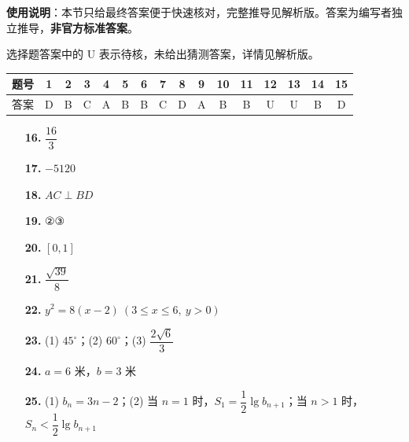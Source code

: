 
\begin{gknotice}
\textbf{使用说明}：本节只给最终答案便于快速核对，完整推导见解析版。答案为编写者独立推导，\textbf{非官方标准答案}。
\end{gknotice}

\begin{gknotice}
选择题答案中的 U 表示待核，未给出猜测答案，详情见解析版。
\end{gknotice}

\begin{center}\begin{tabular}{cccccccccccccccc}
\toprule
题号 & 1 & 2 & 3 & 4 & 5 & 6 & 7 & 8 & 9 & 10 & 11 & 12 & 13 & 14 & 15 \\
\midrule
答案 & D & B & C & A & B & B & C & D & A & B & B & U & U & B & D \\
\bottomrule
\end{tabular}\end{center}

\begin{itemize}[leftmargin=2.6em]
  \item[\textbf{16.}] $\dfrac{16}{3}$
  \item[\textbf{17.}] $-5120$
  \item[\textbf{18.}] $AC\perp BD$
  \item[\textbf{19.}] ②③
\end{itemize}

\begin{itemize}[leftmargin=2.6em]
  \item[\textbf{20.}] $[0,1]$
  \item[\textbf{21.}] $\dfrac{\sqrt{39}}8$
  \item[\textbf{22.}] $y^2=8(x-2)\ (3\le x\le 6,\ y>0)$
  \item[\textbf{23.}] (1) $45^\circ$；(2) $60^\circ$；(3) $\dfrac{2\sqrt6}3$
  \item[\textbf{24.}] $a=6$ 米，$b=3$ 米
  \item[\textbf{25.}] (1) $b_n=3n-2$；(2) 当 $n=1$ 时，$S_1=\dfrac12\lg b_{n+1}$；当 $n>1$ 时，$S_n<\dfrac12\lg b_{n+1}$
\end{itemize}
